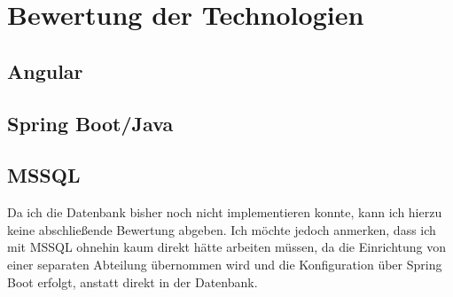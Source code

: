 \chapter{Bewertung der Technologien}
\section{Angular}
\section{Spring Boot/Java}
\section{MSSQL}
Da ich die Datenbank bisher noch nicht implementieren konnte, kann ich hierzu keine abschließende Bewertung abgeben.
Ich möchte jedoch anmerken, dass ich mit MSSQL ohnehin kaum direkt hätte arbeiten müssen, 
da die Einrichtung von einer separaten Abteilung übernommen wird und die Konfiguration über Spring Boot erfolgt, anstatt direkt in der Datenbank.